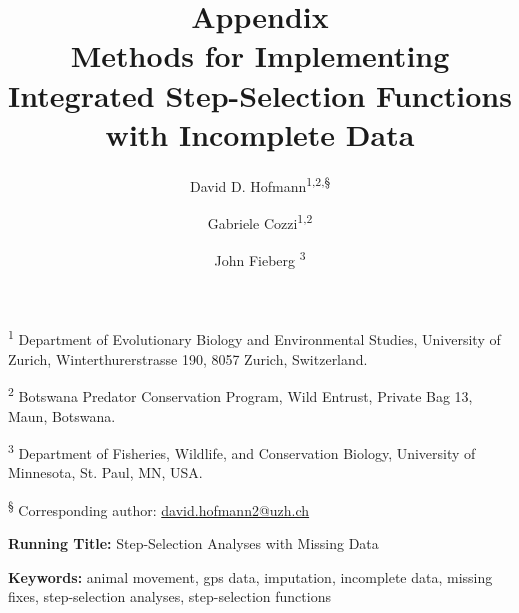 \documentclass[abstract=on,10pt,a4paper,bibliography=totocnumbered]{article}
\title{\textbf{Appendix}\\ Methods for Implementing Integrated Step-Selection
Functions with Incomplete Data}
\author{
  David D. Hofmann\textsuperscript{1,2,\S} \orcid{0000-0003-3477-4365} \and
  Gabriele Cozzi\textsuperscript{1,2} \orcid{0000-0002-1744-1940} \and
  John Fieberg \textsuperscript{3} \orcid{0000-0002-3180-7021}
}
\renewcommand{\theequation}{Equation \arabic{equation}}%
\newcommand{\beginappendix}{%
  \setcounter{table}{0}
  \renewcommand{\thetable}{S\arabic{table}}%
  \setcounter{figure}{0}
  \renewcommand{\thefigure}{S\arabic{figure}}%
  \setcounter{equation}{0}
  \renewcommand{\theequation}{Equation S\arabic{equation}}%
  \setcounter{section}{0}
  \renewcommand{\thesection}{A.\arabic{section}}%
}
\begin{document}

\maketitle

\begin{flushleft}

\vspace{0.5cm}

\textsuperscript{1} Department of Evolutionary Biology and Environmental
Studies, University of Zurich, Winterthurerstrasse 190, 8057 Zurich,
Switzerland.

\textsuperscript{2} Botswana Predator Conservation Program, Wild Entrust,
Private Bag 13, Maun, Botswana.

\textsuperscript{3} Department of Fisheries, Wildlife, and Conservation Biology,
University of Minnesota, St. Paul, MN, USA.

\textsuperscript{\S} Corresponding author: \href{mailto://david.hofmann2@uzh.ch}{david.hofmann2@uzh.ch}

\vspace{4cm}

\textbf{Running Title:} Step-Selection Analyses with Missing Data

\vspace{0.5cm}

\textbf{Keywords:} animal movement, gps data, imputation, incomplete data,
missing fixes, step-selection analyses, step-selection functions

\end{flushleft}

\newpage



\appendix
\beginappendix

\newpage
\end{document}
